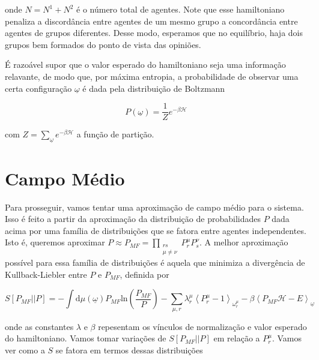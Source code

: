 \documentclass[a4paper, 11pt]{article} %
\begin{document}
onde $N = N^1 + N^2$ é o número total de agentes. Note que esse hamiltoniano
penaliza a discordância entre agentes de um mesmo grupo a concordância entre
agentes de grupos diferentes. Desse modo, esperamos que no equilíbrio, haja dois
grupos bem formados do ponto de vista das opiniões.

É razoável supor que o valor
esperado do hamiltoniano seja uma informação relavante, de modo que, por máxima
entropia, a probabilidade de observar uma certa configuração $\underline \omega$
é dada pela distribuição de Boltzmann 

\[P(\underline \omega) = \frac{1}{Z}e^{-\beta \mathcal{H}}\]

com $ Z = \sum_{\underline \omega} e^{-\beta \mathcal{H}} $ a função de
partição.


\section*{Campo Médio}

Para prosseguir, vamos tentar uma aproximação de campo médio para o sistema.
Isso é feito a partir da aproximação da distribuição de probabilidades $P$ dada
acima por uma família de distribuições que se fatora entre agentes
independentes. Isto é, queremos aproximar $P \approx P_{MF} =
\prod_{\substack{rs\\\mu\ne\nu}}P^{\mu}_rP^{\nu}_s $. A melhor aproximação possível para essa família
de distribuições é aquela que minimiza a divergência de Kullback-Liebler entre
$P$ e $P_{MF}$, definida por 

\begin{equation}
    S[P_{MF}||P] = -\int
    \mathrm{d}\mu(\underline\omega)P_{MF}\mathrm{ln}(\frac{P_{MF}}{P})
    -\sum_{\mu,r}\lambda_r^{\mu}\left<P^{\mu}_r-1\right>_{\omega^{\mu}_r} 
    - \beta\left<P_{MF}\mathcal{H} - E\right>_{\underline\omega}
\end{equation}

onde as constantes $\lambda$ e $\beta$ repesentam os vínculos de normalização e
valor esperado do hamiltoniano. Vamos tomar variações de $S[P_{MF}||P]$ em
relação a $P^{\mu}_r$. Vamos ver como a $S$ se fatora em termos dessas
distribuições
\end{document}
